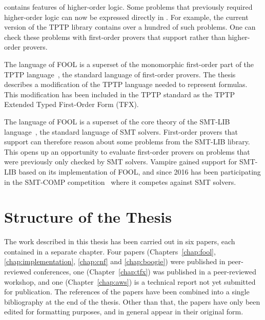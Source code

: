 

\folb{} contains features of higher-order logic. Some problems that previously required higher-order logic can now be expressed directly in \folb{}. For example, the current version of the TPTP library contains over a hundred of such problems. One can check these problems with first-order provers that support \folb{} rather than higher-order provers. 

The language of FOOL is a superset of the monomorphic first-order part of the TPTP language~\cite{tff0}, the standard language of first-order provers. The thesis describes a modification of the TPTP language needed to represent \folb{} formulas. This modification has been included in the TPTP standard as the TPTP Extended Typed First-Order Form (TFX).

The language of FOOL is a superset of the core theory of the SMT-LIB language~\cite{SMT-LIB}, the standard language of SMT solvers. First-order provers that support \folb{} can therefore reason about some problems from the SMT-LIB library. This opens up an opportunity to evaluate first-order provers on problems that were previously only checked by SMT solvers. Vampire gained support for SMT-LIB based on its implementation of FOOL, and since 2016 has been participating in the SMT-COMP competition~\cite{DBLP:conf/cav/BarrettMS05} where it competes against SMT solvers.

\section*{Structure of the Thesis}
\label{sect:intro:overview}

The work described in this thesis has been carried out in six papers, each contained in a separate chapter. Four papers (Chapters~\ref{chap:fool}, \ref{chap:implementation}, \ref{chap:cnf} and \ref{chap:boogie}) were published in peer-reviewed conferences, one (Chapter~\ref{chap:tfx}) was published in a peer-reviewed workshop, and one (Chapter~\ref{chap:aws}) is a technical report not yet submitted for publication. The references of the papers have been combined into a single bibliography at the end of the thesis. Other than that, the papers have only been edited for formatting purposes, and in general appear in their original form.

